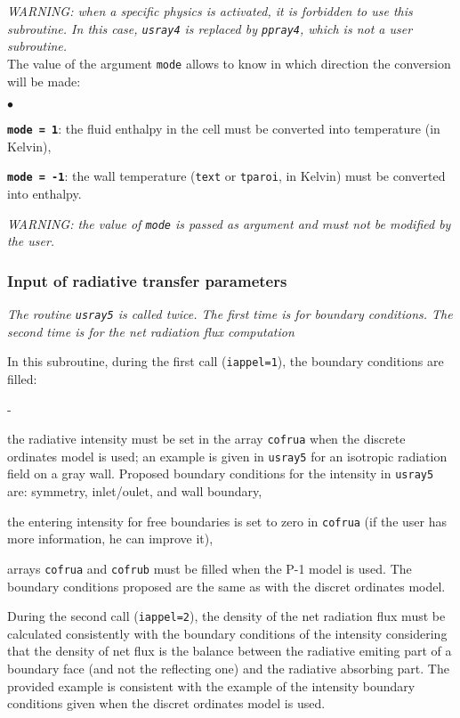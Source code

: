 {{{{\em WARNING: when a specific physics is activated, it is forbidden to use this
subroutine. In this case, {\em \texttt{usray4}} is replaced by {\em
\texttt{ppray4}}, which is not a user subroutine.}\\

\noindent
The value of the argument \texttt{mode} allows to know in which direction the
conversion will be made:
\begin{list}{$\bullet$}{}

\item \texttt{\textbf{mode = 1}}: the fluid enthalpy in the cell must be
      converted into temperature (in Kelvin),

\item \texttt{\textbf{mode = -1}}: the wall temperature (\texttt{text}
      or \texttt{tparoi}, in Kelvin) must be converted into enthalpy.

\end{list}
%
{\em WARNING: the value of \texttt{mode} is passed as argument and must not be
modified by the user.}\\

\subsubsection{Input of radiative transfer parameters}

\noindent
\textit{The routine \texttt{usray5} is called twice. The first time is for boundary 
conditions. The second time is for the net radiation flux computation}

In this subroutine, during the first call (\texttt{iappel=1}), the boundary conditions
 are filled:
\begin{list}{-}{}
\item the radiative intensity must be set in the array \texttt{cofrua} when the discrete
 ordinates model is used; an example is given in \texttt{usray5} for an isotropic radiation
 field on a gray wall. Proposed boundary conditions for the intensity in \texttt{usray5} are: 
symmetry, inlet/oulet, and wall boundary,
\item the entering intensity for free boundaries is set to zero in \texttt{cofrua} (if the 
user has more information, he can improve it),
\item arrays \texttt{cofrua} and \texttt{cofrub} must be filled when the P-1 model is
 used. The boundary conditions proposed are the same as with the discret ordinates model.
\end{list}
During the second call (\texttt{iappel=2}), the density of the net radiation flux must be
 calculated consistently with the boundary conditions of the intensity considering that the 
density of net flux is the balance between the radiative emiting part of a boundary face 
(and not the reflecting one) and the radiative absorbing part. The provided example is 
consistent with the example of the intensity boundary conditions given when the discret
 ordinates model is used.


}}}
